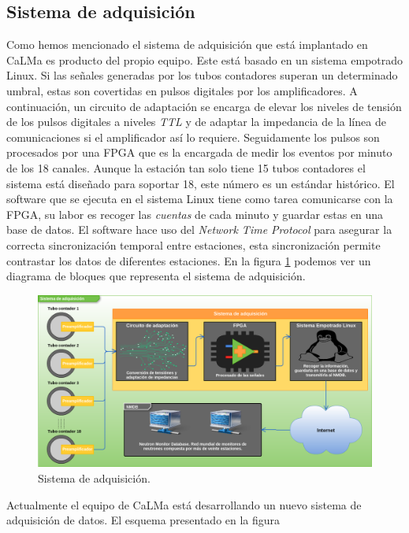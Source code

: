 	\subsection{Sistema de adquisición}
		Como hemos mencionado el sistema de adquisición que está implantado en CaLMa es producto del propio equipo\cite{Garcia2014}. Este está
		basado en un sistema empotrado Linux. Si las señales generadas por los tubos contadores superan un determinado umbral, estas son
		covertidas en pulsos digitales por los amplificadores. A continuación, un circuito de adaptación se encarga de elevar los niveles de
		tensión de los pulsos digitales a niveles \emph{TTL} y de adaptar la impedancia de la línea de comunicaciones si el amplificador
		así lo requiere. Seguidamente los pulsos son procesados por una FPGA que es la encargada de medir los eventos por minuto de los 18
		canales. Aunque la estación tan solo tiene 15 tubos contadores el sistema está diseñado para soportar 18, este número es un estándar
		histórico. El software que se ejecuta en el sistema Linux tiene como tarea comunicarse con la FPGA, su labor es recoger las
		\emph{cuentas} de cada minuto y guardar estas en una base de datos. El software hace uso del \emph{Network Time Protocol} para
		asegurar la correcta sincronización temporal entre estaciones, esta sincronización permite contrastar los datos de diferentes
		estaciones. En la figura \ref{fig:acqsis} podemos ver un diagrama de bloques que representa el sistema de adquisición.
		\begin{figure}[h]
			\centering
			\includegraphics[keepaspectratio, width=1\textwidth]{./img/AcqSis.png}
			\caption{Sistema de adquisición.}
			\label{fig:acqsis}
		\end{figure}
		\par
		Actualmente el equipo de CaLMa está desarrollando un nuevo sistema de adquisición de datos. El esquema presentado en la figura
